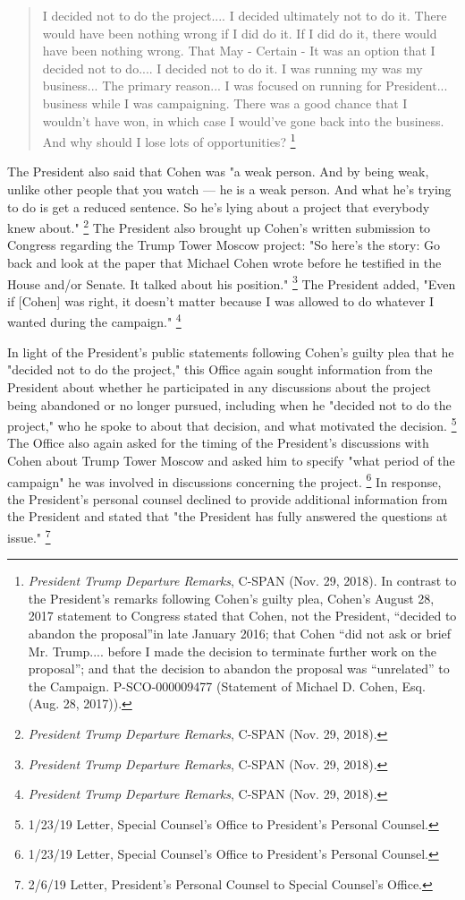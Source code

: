 {\begin{quote}
I decided not to do the project....
I decided ultimately not to do it.
There would have been nothing wrong if I did do it.
If I did do it, there would have been nothing wrong.
That
May - Certain -
It was an option that I decided not to do....
I decided not to do it.
I was running my
was my business...
The primary reason...
I was focused on running for President...
business while I was campaigning.
There was a good chance that I wouldn't have won, in which case I would've gone back into the business.
And why should I lose lots of opportunities?%
\footnote{\textit{President Trump Departure Remarks}, C-SPAN (Nov. 29, 2018).
In contrast to the President’s remarks following Cohen’s guilty plea, Cohen’s August 28, 2017 statement to Congress stated that Cohen, not the President, “decided to abandon the proposal”in late January 2016;
that Cohen “did not ask or brief Mr. Trump.... before I made the decision to terminate further work on the proposal”;
and that the decision to abandon the proposal was “unrelated” to the Campaign. P-SCO-000009477 (Statement of Michael D. Cohen, Esq. (Aug. 28, 2017)).
}
\end{quote}

The President also said that Cohen was "a weak person.
And by being weak, unlike other people that you watch — he is a weak person.
And what he's trying to do is get a reduced sentence.
So he's lying about a project that everybody knew about."%
\footnote{\textit{President Trump Departure Remarks}, C-SPAN (Nov. 29, 2018).}
The President also brought up Cohen's written submission to Congress regarding the Trump Tower Moscow project:
"So here's the story: Go back and look at the paper that Michael Cohen wrote before he testified in the House and/or Senate.
It talked about his position."%
\footnote{\textit{President Trump Departure Remarks}, C-SPAN (Nov. 29, 2018).}
The President added, "Even if [Cohen] was right, it doesn't matter because I was allowed to do whatever I wanted during the campaign."%
\footnote{\textit{President Trump Departure Remarks}, C-SPAN (Nov. 29, 2018).}

In light of the President's public statements following Cohen's guilty plea that he "decided not to do the project," this Office again sought information from the President about whether he participated in any discussions about the project being abandoned or no longer pursued, including when he "decided not to do the project," who he spoke to about that decision, and what motivated the decision.%
\footnote{1/23/19 Letter, Special Counsel’s Office to President’s Personal Counsel.}
The Office also again asked for the timing of the President's discussions with Cohen about Trump Tower Moscow and asked him to specify "what period of the campaign" he was involved in discussions concerning the project.%
\footnote{1/23/19 Letter, Special Counsel’s Office to President’s Personal Counsel.}
In response, the President's personal counsel declined to provide additional information from the President and stated that "the President has fully answered the questions at issue."%
\footnote{2/6/19 Letter, President’s Personal Counsel to Special Counsel’s Office.}

}
